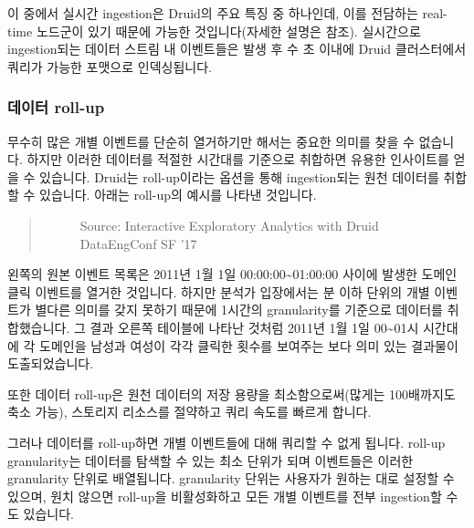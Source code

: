 \documentclass[letterpaper,10pt,english]{sphinxmanual}
\begin{document}
이 중에서 실시간 ingestion은 Druid의 주요 특징 중 하나인데, 이를 전담하는 real-time 노드군이 있기 때문에 가능한 것입니다(자세한 설명은 {\hyperref[\detokenize{discovery/part01/druid_nodes:realtime-nodes}]{}} 참조). 실시간으로 ingestion되는 데이터 스트림 내 이벤트들은 발생 후 수 초 이내에 Druid 클러스터에서 쿼리가 가능한 포맷으로 인덱싱됩니다.


\subsubsection{데이터 roll-up}
\label{\detokenize{discovery/part01/druid_features:roll-up}}\label{\detokenize{discovery/part01/druid_features:data-rollup}}
무수히 많은 개별 이벤트를 단순히 열거하기만 해서는 중요한 의미를 찾을 수 없습니다. 하지만 이러한 데이터를 적절한 시간대를 기준으로 취합하면 유용한 인사이트를 얻을 수 있습니다. Druid는 roll-up이라는 옵션을 통해 ingestion되는 원천 데이터를 취합할 수 있습니다. 아래는 roll-up의 예시를 나타낸 것입니다.
\begin{quote}

\begin{figure}[H]
\centering
\capstart

\noindent{}
\caption{Source: Interactive Exploratory Analytics with Druid \textbar{} DataEngConf SF '17}\label{\detokenize{discovery/part01/druid_features:id7}}\end{figure}
\end{quote}

왼쪽의 원본 이벤트 목록은 2011년 1월 1일 00:00:00\textasciitilde{}01:00:00 사이에 발생한 도메인 클릭 이벤트를 열거한 것입니다. 하지만 분석가 입장에서는 분 이하 단위의 개별 이벤트가 별다른 의미를 갖지 못하기 때문에 1시간의 granularity를 기준으로 데이터를 취합했습니다. 그 결과 오른쪽 테이블에 나타난 것처럼 2011년 1월 1일 00\textasciitilde{}01시 시간대에 각 도메인을 남성과 여성이 각각 클릭한 횟수를 보여주는 보다 의미 있는 결과물이 도출되었습니다.

또한 데이터 roll-up은 원천 데이터의 저장 용량을 최소함으로써(많게는 100배까지도 축소 가능), 스토리지 리소스를 절약하고 쿼리 속도를 빠르게 합니다.

그러나 데이터를 roll-up하면 개별 이벤트들에 대해 쿼리할 수 없게 됩니다. roll-up granularity는 데이터를 탐색할 수 있는 최소 단위가 되며 이벤트들은 이러한 granularity 단위로 배열됩니다. granularity 단위는 사용자가 원하는 대로 설정할 수 있으며, 원치 않으면 roll-up을 비활성화하고 모든 개별 이벤트를 전부 ingestion할 수도 있습니다.
\end{document}
